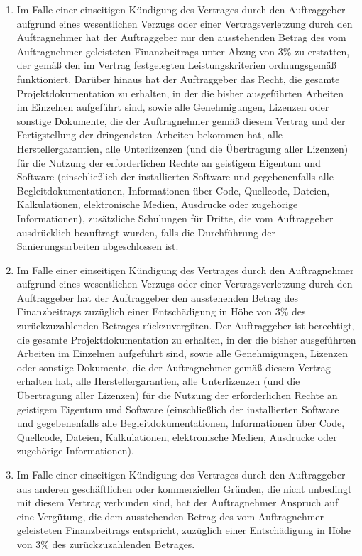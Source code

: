 \begin{multicols}{2}
\begin{enumerate}
\begin{enumerate}
   \item Im Falle einer einseitigen Kündigung des Vertrages durch den Auftraggeber aufgrund eines wesentlichen Verzugs oder einer Vertragsverletzung durch den Auftragnehmer hat der Auftraggeber nur den ausstehenden Betrag des vom Auftragnehmer geleisteten Finanzbeitrags unter Abzug von 3\% zu erstatten, der gemäß den im Vertrag festgelegten Leistungskriterien ordnungsgemäß funktioniert. Darüber hinaus hat der Auftraggeber das Recht, die gesamte Projektdokumentation zu erhalten, in der die bisher ausgeführten Arbeiten im Einzelnen aufgeführt sind, sowie alle Genehmigungen, Lizenzen oder sonstige Dokumente, die der Auftragnehmer gemäß diesem Vertrag und der Fertigstellung der dringendsten Arbeiten bekommen hat, alle Herstellergarantien, alle Unterlizenzen (und die Übertragung aller Lizenzen) für die Nutzung der erforderlichen Rechte an geistigem Eigentum und Software (einschließlich der installierten Software und gegebenenfalls alle Begleitdokumentationen, Informationen über Code, Quellcode, Dateien, Kalkulationen, elektronische Medien, Ausdrucke oder zugehörige Informationen), zusätzliche Schulungen für Dritte, die vom Auftraggeber ausdrücklich beauftragt wurden, falls die Durchführung der Sanierungsarbeiten abgeschlossen ist.
   \item Im Falle einer einseitigen Kündigung des Vertrages durch den Auftragnehmer aufgrund eines wesentlichen Verzugs oder einer Vertragsverletzung durch den Auftraggeber hat der Auftraggeber den ausstehenden Betrag des Finanzbeitrags zuzüglich einer Entschädigung in Höhe von 3\% des zurückzuzahlenden Betrages rückzuvergüten. Der Auftraggeber ist berechtigt, die gesamte Projektdokumentation zu erhalten, in der die bisher ausgeführten Arbeiten im Einzelnen aufgeführt sind, sowie alle Genehmigungen, Lizenzen oder sonstige Dokumente, die der Auftragnehmer gemäß diesem Vertrag erhalten hat, alle Herstellergarantien, alle Unterlizenzen (und die Übertragung aller Lizenzen) für die Nutzung der erforderlichen Rechte an geistigem Eigentum und Software (einschließlich der installierten Software und gegebenenfalls alle Begleitdokumentationen, Informationen über Code, Quellcode, Dateien, Kalkulationen, elektronische Medien, Ausdrucke oder zugehörige Informationen).
   \item Im Falle einer einseitigen Kündigung des Vertrages durch den Auftraggeber aus anderen geschäftlichen oder kommerziellen Gründen, die nicht unbedingt mit diesem Vertrag verbunden sind, hat der Auftragnehmer Anspruch auf eine Vergütung, die dem ausstehenden Betrag des vom Auftragnehmer geleisteten Finanzbeitrags entspricht, zuzüglich einer Entschädigung in Höhe von 3\% des zurückzuzahlenden Betrages.

\end{enumerate}
\end{enumerate}
\end{multicols}

